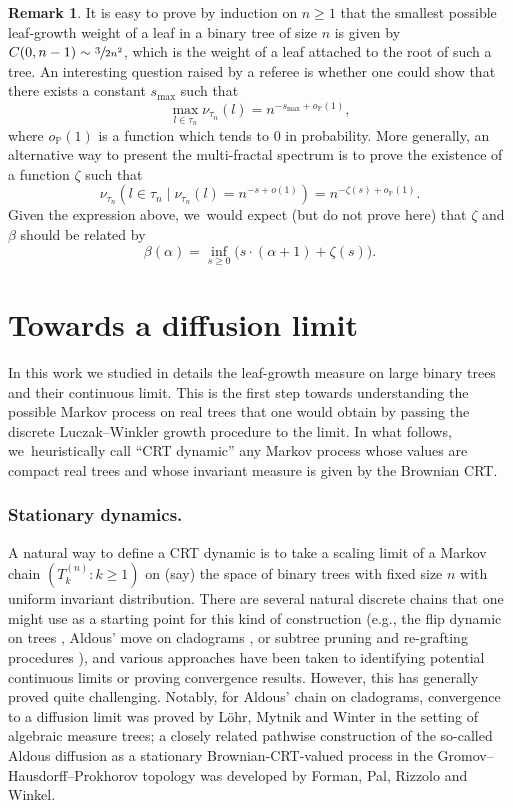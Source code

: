 \documentclass[JEP,XML,SOM,Unicode,NoFloatCountersInSection, NoEqCountersInSection,published]{cedram}
\theoremstyle{definition}
\newtheorem{rem}[thm]{Remark}
\begin{document}
\begin{rem}\label{rem:multi-fractal}It is easy to prove by induction on $n \geq 1$ that the smallest possible leaf-growth weight of a leaf in a binary tree of size $n$ is given by $C(0,n-1) \sim \sfrac{3}{2 n^2}$, which is the weight of a leaf attached to the root of such a tree. An interesting question raised by a referee is whether one could show that there exists a constant $s_{\max}$ such that
\[
\max_{l \in \tau_n} \nu_{\tau_n}(l) = n^{-s_{\max} + o_{\mathbb{P}}(1)},
\]
where $o_{\mathbb{P}}(1)$ is a function which tends to $0$ in probability. More generally, an alternative way to present the multi-fractal spectrum is to prove the existence of a function $\zeta$ such that
\[
\nu_{\tau_n}(l \in \tau_n \mid \nu_{\tau_n}(l) = n^{-s+o(1)}) = n^{-\zeta(s)+o_{\mathbb{P}}(1)}.
\]
Given the expression above, we~would expect (but do not prove here) that $\zeta$ and $\beta$ should be related by
\[
\beta(\alpha) = \inf_{s \geq 0} \big(s\cdot (\alpha+1) + \zeta(s)\big).
\]
\end{rem}

\section{Towards a diffusion limit}
In this work we studied in details the leaf-growth measure on large binary trees and their continuous limit. This is the first step towards understanding the possible Markov process on real trees that one would obtain by passing the discrete Luczak--Winkler growth procedure to the limit. In what follows, we~heuristically call ``CRT dynamic'' any Markov process whose values are compact real trees and whose invariant measure is given by the Brownian CRT.

\subsubsection*{Stationary dynamics.} A natural way to define a CRT dynamic is to take a scaling limit of a Markov chain $(T^{(n)}_k : k \geq 1)$ on (say) the space of binary trees with fixed size $n$ with uniform invariant distribution. There are several natural discrete chains that one might use as a starting point for this kind of construction (e.g., the flip dynamic on trees \cite{mcshine1997mixing}, Aldous' move on cladograms \cite{lohr2020aldous,forman2023aldous}, or subtree pruning and re-grafting procedures \cite{EW06}), and various approaches have been taken to identifying potential continuous limits or proving convergence results. However, this has generally proved quite challenging. Notably, for Aldous' chain on cladograms, convergence to a diffusion limit was proved by Löhr, Mytnik and Winter in the setting of algebraic measure trees; a closely related pathwise construction of the so-called Aldous diffusion as a stationary Brownian-CRT-valued process in the Gromov–Hausdorff–Prokhorov topology was developed by Forman, Pal, Rizzolo and Winkel.
\end{document}
